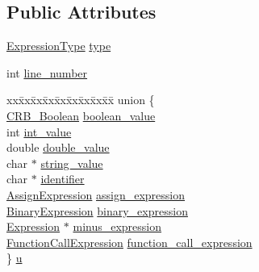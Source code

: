 \subsection*{Public Attributes}
\begin{DoxyCompactItemize}
\item 
\hyperlink{crowbar_8h_a51ad9989dafb48362f7e9354d68fe720}{Expression\+Type} \hyperlink{struct_expression__tag_a6e554d04874c28168b1294ad4860c2dc}{type}
\item 
int \hyperlink{struct_expression__tag_a00e220318941223a55e140e8ed0abff8}{line\+\_\+number}
\item 
\begin{tabbing}
xx\=xx\=xx\=xx\=xx\=xx\=xx\=xx\=xx\=\kill
union \{\\
\>\hyperlink{_c_r_b__dev_8h_a5000f2b447c9132c07d7f1cf66134a69}{CRB\_Boolean} \hyperlink{struct_expression__tag_aab2eb6d343ff191cb3017ae63a3588e3}{boolean\_value}\\
\>int \hyperlink{struct_expression__tag_a5b693b70a19d0fcd9a59861f71c14d7d}{int\_value}\\
\>double \hyperlink{struct_expression__tag_a23f1bc42ce2726e7c1ab776e88e2529e}{double\_value}\\
\>char $\ast$ \hyperlink{struct_expression__tag_a850dde0947b60a3a0a0aaf1d1509bbe1}{string\_value}\\
\>char $\ast$ \hyperlink{struct_expression__tag_a135bf93dc623a22f1f6eab611d65efc4}{identifier}\\
\>\hyperlink{struct_assign_expression}{AssignExpression} \hyperlink{struct_expression__tag_a889fe74ac3b67e574a1117850019aaad}{assign\_expression}\\
\>\hyperlink{struct_binary_expression}{BinaryExpression} \hyperlink{struct_expression__tag_aa855e521467183437ce1e72cc6bca675}{binary\_expression}\\
\>\hyperlink{crowbar_8h_a070c6feb370aad8a9665ca315bf6ed4a}{Expression} $\ast$ \hyperlink{struct_expression__tag_a87097a9f90ba91c0ff09983029b582e9}{minus\_expression}\\
\>\hyperlink{struct_function_call_expression}{FunctionCallExpression} \hyperlink{struct_expression__tag_ad1e62b0e65d2885da97209927845d444}{function\_call\_expression}\\
\} \hyperlink{struct_expression__tag_a0bb1fed3e5d9b4a6601d6783eb6bb9c3}{u}\\

\end{tabbing}\end{DoxyCompactItemize}


